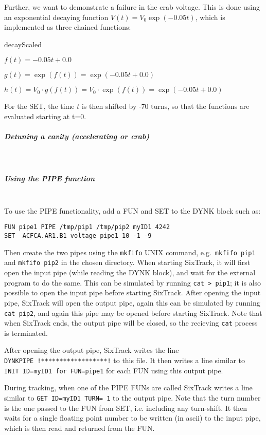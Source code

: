 \documentclass[a4paper,11pt]{report}
\newenvironment{description_alligned}[1]
{\begin{list}{}%
    {\renewcommand\makelabel[1]{##1:\hfill}%
      \settowidth\labelwidth{\makelabel{#1}}%
      \setlength\leftmargin{\labelwidth}
      \addtolength\leftmargin{\labelsep}}}
  {\end{list}}
\begin{document}
Further, we want to demonstrate a failure in the crab voltage.
This is done using an exponential decaying function $V(t) = V_0 \exp\left(-0.05 t\right)$, which is implemented as three chained functions:
\begin{description_alligned}{decayScaled}
\item[expCore] $f(t) = -0.05 t + 0.0$
\item[decay] $g(t) = \exp(f(t)) = \exp(-0.05 t + 0.0)$
\item[decayScaled] $h(t) = V_0 \cdot g(f(t)) = V_0 \cdot \exp(f(t)) = \exp(-0.05 t + 0.0)$
\end{description_alligned}
For the SET, the time $t$ is then shifted by -70 turns, so that the functions are evaluated starting at t=0.

\subparagraph{Detuning a cavity (accelerating or crab)}~\\

\subparagraph{Using the PIPE function}~\\

To use the PIPE functionality, add a FUN and SET to the DYNK block such as:
\begin{verbatim}
FUN pipe1 PIPE /tmp/pip1 /tmp/pip2 myID1 4242
SET  ACFCA.AR1.B1 voltage pipe1 10 -1 -9
\end{verbatim}
Then create the two pipes using the \texttt{mkfifo} UNIX command, e.g.\ \texttt{mkfifo~pip1} and \texttt{mkfifo~pip2} in the chosen directory.
When starting SixTrack, it will first open the input pipe (while reading the DYNK block), and wait for the external program to do the same.
This can be simulated by running \texttt{cat~>~pip1}; it is also possible to open the input pipe before starting SixTrack.
After opening the input pipe, SixTrack will open the output pipe, again this can be simulated by running \texttt{cat~pip2}, and again this pipe may be opened before starting SixTrack.
Note that when SixTrack ends, the output pipe will be closed, so the recieving \texttt{cat} process is terminated.

After opening the output pipe, SixTrack writes the line \texttt{DYNKPIPE~!******************!} to this file.
It then writes a line similar to \texttt{INIT~ID=myID1~for~FUN=pipe1} for each FUN using this output pipe.

During tracking, when one of the PIPE FUNs are called SixTrack writes a line similar to \texttt{GET ID=myID1 TURN=~1} to the output pipe.
Note that the turn number is the one passed to the FUN from SET, i.e. including any turn-shift.
It then waits for a single floating point number to be written (in ascii) to the input pipe, which is then read and returned from the FUN.
\end{document}

